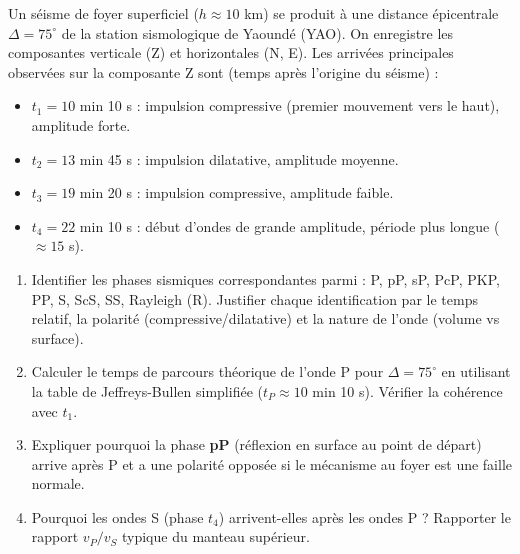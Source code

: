 \documentclass[11pt]{article}
\begin{document}
\begin{exercice}
Un séisme de foyer superficiel ($h \approx 10$ km) se produit à une distance épicentrale $\Delta = 75^\circ$ de la station sismologique de Yaoundé (YAO). On enregistre les composantes verticale (Z) et horizontales (N, E). Les arrivées principales observées sur la composante Z sont (temps après l'origine du séisme) :
\begin{itemize}
    \item $t_1 = 10$ min 10 s : impulsion compressive (premier mouvement vers le haut), amplitude forte.
    \item $t_2 = 13$ min 45 s : impulsion dilatative, amplitude moyenne.
    \item $t_3 = 19$ min 20 s : impulsion compressive, amplitude faible.
    \item $t_4 = 22$ min 10 s : début d'ondes de grande amplitude, période plus longue ($\approx 15$ s).
\end{itemize}
\begin{enumerate}
    \item Identifier les phases sismiques correspondantes parmi : P, pP, sP, PcP, PKP, PP, S, ScS, SS, Rayleigh (R). Justifier chaque identification par le temps relatif, la polarité (compressive/dilatative) et la nature de l'onde (volume vs surface).
    \item Calculer le temps de parcours théorique de l'onde P pour $\Delta = 75^\circ$ en utilisant la table de Jeffreys-Bullen simplifiée ($t_P \approx 10$ min 10 s). Vérifier la cohérence avec $t_1$.
    \item Expliquer pourquoi la phase \textbf{pP} (réflexion en surface au point de départ) arrive après P et a une polarité opposée si le mécanisme au foyer est une faille normale.
    \item Pourquoi les ondes S (phase $t_4$) arrivent-elles après les ondes P ? Rapporter le rapport $v_P/v_S$ typique du manteau supérieur.
\end{enumerate}
\end{exercice}
\end{document}

